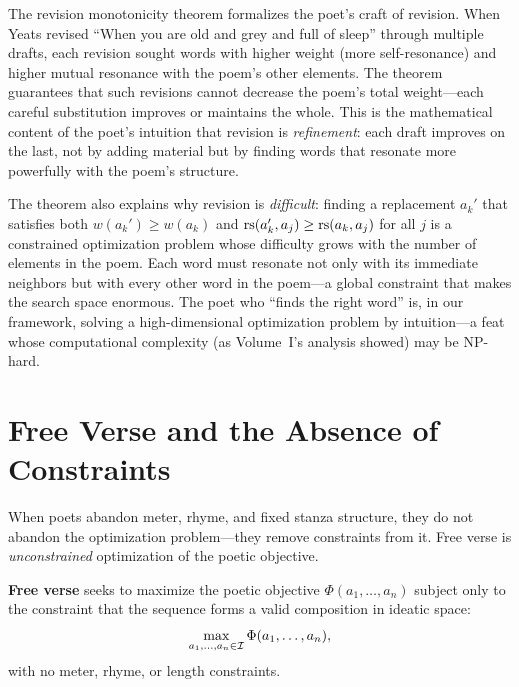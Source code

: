 \begin{remark}
\label{rem:revision-craft}
The revision monotonicity theorem formalizes the poet's craft of revision.  When Yeats revised ``When you are old and grey and full of sleep'' through multiple drafts, each revision sought words with higher weight (more self-resonance) and higher mutual resonance with the poem's other elements.  The theorem guarantees that such revisions cannot decrease the poem's total weight---each careful substitution improves or maintains the whole.  This is the mathematical content of the poet's intuition that revision is \emph{refinement}: each draft improves on the last, not by adding material but by finding words that resonate more powerfully with the poem's structure.

The theorem also explains why revision is \emph{difficult}: finding a replacement $a_k'$ that satisfies both $w(a_k') \geq w(a_k)$ and $\mathrm{rs}(a_k', a_j) \geq \mathrm{rs}(a_k, a_j)$ for all $j$ is a constrained optimization problem whose difficulty grows with the number of elements in the poem.  Each word must resonate not only with its immediate neighbors but with every other word in the poem---a global constraint that makes the search space enormous.  The poet who ``finds the right word'' is, in our framework, solving a high-dimensional optimization problem by intuition---a feat whose computational complexity (as Volume~I's analysis showed) may be NP-hard.
\end{remark}


\section{Free Verse and the Absence of Constraints}

When poets abandon meter, rhyme, and fixed stanza structure, they do not abandon
the optimization problem---they remove constraints from it.  Free verse is
\emph{unconstrained} optimization of the poetic objective.

\begin{definition}
\label{def:free-verse}
\textbf{Free verse} seeks to maximize the poetic objective
$\Phi(a_1, \ldots, a_n)$ subject only to the constraint that the
sequence forms a valid composition in ideatic space:
\[
  \max_{a_1, \ldots, a_n \in \mathcal{I}} \Phi(a_1, \ldots, a_n),
\]
with no meter, rhyme, or length constraints.
\end{definition}

